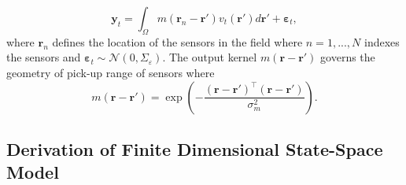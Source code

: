 \documentclass[twocolumn,11pt,a4paper]{article}		%
\begin{document}
\begin{equation}
	\mathbf{y}_t = \int_{\Omega}{m\left(\mathbf{r}_n-\mathbf{r}'\right)v_t\left(\mathbf{r}'\right)d\mathbf{r}'} + \boldsymbol{\varepsilon}_t, 
\end{equation}
where $\mathbf{r}_n$ defines the location of the sensors in the field where $n=1,...,N$ indexes the sensors and $\boldsymbol{\varepsilon}_t \sim \mathcal{N}\left(0,\Sigma_{\varepsilon}\right)$. The output kernel $m(\mathbf{r}-\mathbf{r}')$ governs the geometry of pick-up range of sensors where 
\begin{equation}
	m\left(\mathbf{r}-\mathbf{r}'\right) = \exp{\left(-\frac{(\mathbf{r}-\mathbf{r}')^\top(\mathbf{r}-\mathbf{r}')}{\sigma_m^2}\right)}. 
\end{equation}

\subsection{Derivation of Finite Dimensional State-Space Model} 
\end{document}
